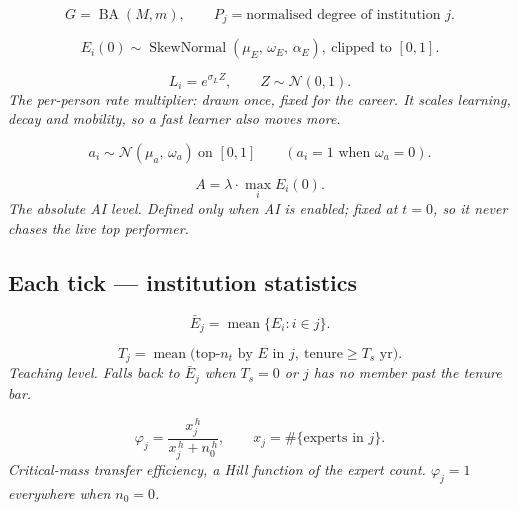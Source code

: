 \documentclass[11pt]{article}
\newcommand{\eqnote}[1]{{\small\itshape #1}\par\addvspace{4pt}}
\begin{document}
\begin{equation}\label{eq:E1}
  G = \operatorname{BA}(M, m), \qquad
  P_j = \text{normalised degree of institution } j .
\end{equation}

\begin{equation}\label{eq:E2}
  E_i(0) \sim \operatorname{SkewNormal}(\mu_E,\, \omega_E,\, \alpha_E),
  \ \text{clipped to } [0,1].
\end{equation}

\begin{equation}\label{eq:E3}
  L_i = e^{\sigma_L Z}, \qquad Z \sim \mathcal{N}(0,1).
\end{equation}
\eqnote{The per-person rate multiplier: drawn once, fixed for the career. It
scales learning, decay \emph{and} mobility, so a fast learner also moves more.}

\begin{equation}\label{eq:E4}
  a_i \sim \mathcal{N}(\mu_a,\, \omega_a) \ \text{on } [0,1]
  \qquad (a_i = 1 \text{ when } \omega_a = 0).
\end{equation}

\begin{equation}\label{eq:E5}
  A = \lambda \cdot \max_i E_i(0).
\end{equation}
\eqnote{The absolute AI level. Defined only when AI is enabled; fixed at $t=0$, so
it never chases the live top performer.}

\subsection*{Each tick --- institution statistics}

\begin{equation}\label{eq:E6}
  \bar E_j = \operatorname{mean}\{E_i : i \in j\}.
\end{equation}

\begin{equation}\label{eq:E7}
  T_j = \operatorname{mean}\bigl(\text{top-}n_t \text{ by } E \text{ in } j,\
        \text{tenure} \ge T_s \text{ yr}\bigr).
\end{equation}
\eqnote{Teaching level. Falls back to $\bar E_j$ when $T_s = 0$ or $j$ has no
member past the tenure bar.}

\begin{equation}\label{eq:E8}
  \varphi_j = \frac{x_j^{\,h}}{x_j^{\,h} + n_0^{\,h}}, \qquad
  x_j = \#\{\text{experts in } j\}.
\end{equation}
\eqnote{Critical-mass transfer efficiency, a Hill function of the expert count.
$\varphi_j = 1$ everywhere when $n_0 = 0$.}
\end{document}
